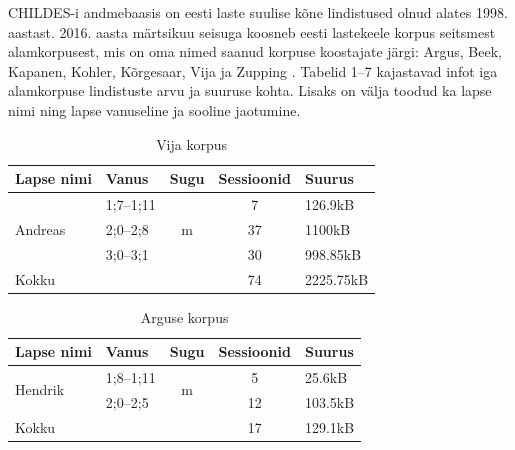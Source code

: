 \documentclass[12pt]{article}
\begin{document}
CHILDES-i andmebaasis on eesti laste suulise kõne lindistused olnud alates 1998. aastast. 2016. aasta märtsikuu seisuga koosneb eesti lastekeele korpus seitsmest alamkorpusest, mis on oma nimed saanud korpuse koostajate järgi: Argus, Beek, Kapanen, Kohler, Kõrgesaar, Vija ja Zupping \citep{CHILDES}. Tabelid 1--7 kajastavad infot iga alamkorpuse lindistuste arvu ja suuruse kohta. Lisaks on välja toodud ka lapse nimi ning lapse vanuseline ja sooline jaotumine.\\
\hfill

\begin{table}[H]
\centering
\caption{Vija korpus}
\begin{tabular}{|l|l|c|c|l|}
\hline
Lapse nimi               & Vanus     & Sugu               & Sessioonid & Suurus  \\ \hline\hline
\multirow{3}{*}{Andreas} & 1;7--1;11 & \multirow{3}{*}{m} & 7          & 126.9kB   \\ \cline{2-2} \cline{4-5} 
                         & 2;0--2;8  &                    & 37         & 1100kB    \\ \cline{2-2} \cline{4-5} 
                         & 3;0--3;1  &                    & 30         & 998.85kB  \\ \hline
Kokku                    & \multicolumn{2}{l|}{}          & 74         & 2225.75kB \\ \hline
\end{tabular}
\end{table}
\hfill

\begin{table}[H]
\centering
\caption{Arguse korpus}
\begin{tabular}{|l|l|c|c|l|}
\hline
Lapse nimi               & Vanus     & \multicolumn{1}{l|}{Sugu} & \multicolumn{1}{l|}{Sessioonid} & Suurus \\ \hline\hline
\multirow{2}{*}{Hendrik} & 1;8--1;11 & \multirow{2}{*}{m}        & 5                               & 25.6kB   \\ \cline{2-2} \cline{4-5} 
                         & 2;0--2;5  &                           & 12                              & 103.5kB  \\ \hline
Kokku                    & \multicolumn{2}{l|}{}                 & 17                              & 129.1kB  \\ \hline
\end{tabular}
\end{table}
\hfill
\end{document}
